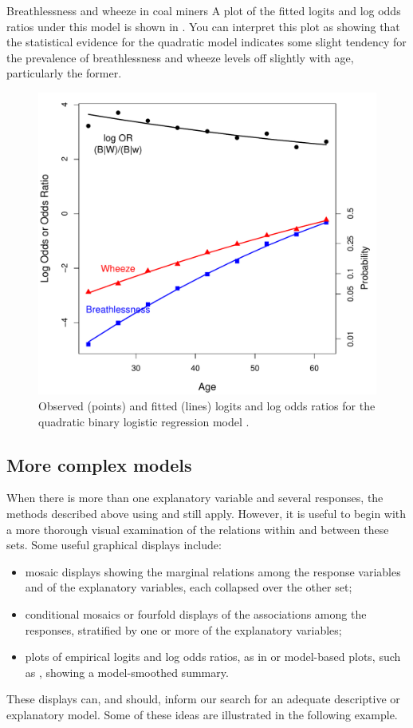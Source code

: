 \documentclass[11pt]{book}\usepackage[]{graphicx}\usepackage[]{color}
\begin{document}
\begin{Example}[coalminers]{Breathlessness and wheeze in coal miners}
A plot of the fitted logits and log odds ratios under this model is shown in .
You can interpret this plot as showing that the statistical evidence for the quadratic
model indicates some slight tendency for the prevalence of breathlessness and wheeze levels off
slightly with age, particularly the former.
\begin{figure}[!htb]
\centering
\includegraphics[width=.8\textwidth]{ch08/fig/cm-vglm2-blogit}
\caption{Observed (points) and fitted (lines) logits and log odds ratios
 for the quadratic binary logistic regression model .}
\label{fig:cm-vglm2-blogit}
\end{figure}


\end{Example}

\subsection{More complex models}
When there is more than one explanatory variable and several responses,
the methods described above using  and  still
apply.  However, it is useful to begin with a more thorough
visual examination of the relations within and between these sets.
Some useful graphical displays include:
\begin{itemize}
\item mosaic displays showing the marginal relations among the response variables
and of the explanatory variables, each collapsed over the other set;
\item conditional mosaics or fourfold displays of the associations among
the responses, stratified by one or more of the explanatory variables;
\item plots of empirical logits and log odds ratios, as in 
or model-based plots, such as , showing a model-smoothed
summary.
\end{itemize}
These displays can, and should, inform our search for an adequate
descriptive or explanatory model.  Some of these ideas are illustrated in the following
example.
\end{document}
